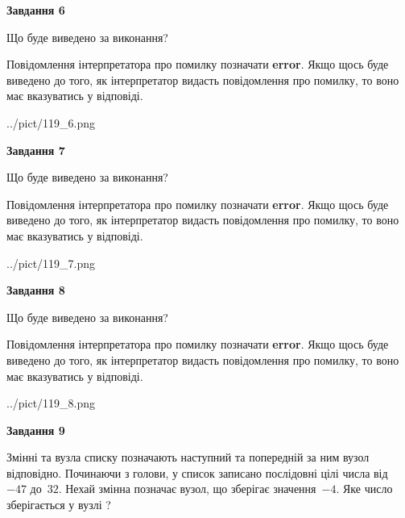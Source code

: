\documentclass[12pt, ukrainian]{article}
\begin{document}
{\begin {large}
{\begin {center}\textbf{Завдання 6}\end {center}}\par
Що буде виведено за виконання?

Повідомлення інтерпретатора про помилку позначати \textbf{error}.
Якщо щось буде виведено до того, як інтерпретатор видасть повідомлення про помилку, 
то воно має вказуватись у відповіді. \par


\begin{center}
	{../pict/119_6.png}
\end{center}
\newpage

{\begin {center}\textbf{Завдання 7}\end {center}}\par
Що буде виведено за виконання?

Повідомлення інтерпретатора про помилку позначати \textbf{error}.
Якщо щось буде виведено до того, як інтерпретатор видасть повідомлення про помилку, 
то воно має вказуватись у відповіді. \par


\begin{center}
	{../pict/119_7.png}
\end{center}
\newpage

{\begin {center}\textbf{Завдання 8}\end {center}}\par
Що буде виведено за виконання?

Повідомлення інтерпретатора про помилку позначати \textbf{error}.
Якщо щось буде виведено до того, як інтерпретатор видасть повідомлення про помилку, 
то воно має вказуватись у відповіді. \par


\begin{center}
	{../pict/119_8.png}
\end{center}
\newpage

{\begin {center}\textbf{Завдання 9}\end {center}}\par
Змінні  та  вузла списку позначають наступний та попередній за ним вузол відповідно. Починаючи з голови, у список записано послідовні цілі числа від~$-47$ до~$32$. Нехай змінна  позначає вузол, що зберігає значення~$-4$.
Яке число зберігається у вузлі  ?\par
\newpage


\end{large}}
\end{document}
